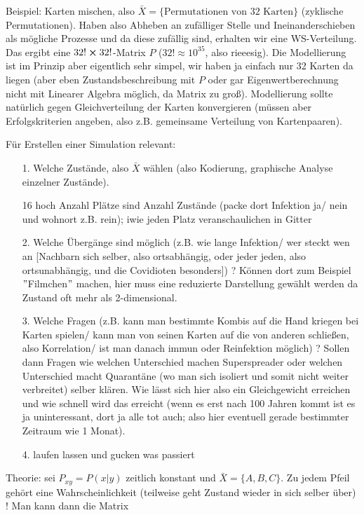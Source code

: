 \documentclass[../KlassMech_main.tex]{subfiles}
\begin{document}
Beispiel: Karten mischen, also $\bar{X}= \{\text{Permutationen von 32 Karten}\}$ (zyklische Permutationen). Haben also Abheben an zufälliger Stelle und Ineinanderschieben als mögliche Prozesse und da diese zufällig sind, erhalten wir eine WS-Verteilung. Das ergibt eine $32! \cross 32!$-Matrix $P$ ($32! \approx10^{35}$, also rieeesig). Die Modellierung ist im Prinzip aber eigentlich sehr simpel, wir haben ja einfach nur 32 Karten da liegen (aber eben Zustandsbeschreibung mit $P$ oder gar Eigenwertberechnung nicht mit Linearer Algebra möglich, da Matrix zu groß). Modellierung sollte natürlich gegen Gleichverteilung der Karten konvergieren (müssen aber Erfolgskriterien angeben, also z.B. gemeinsame Verteilung von Kartenpaaren).

Für Erstellen einer Simulation relevant:
\begin{itemize}
\item[1.] Welche Zustände, also $\bar{X}$ wählen (also Kodierung, graphische Analyse einzelner Zustände).

16 hoch Anzahl Plätze sind Anzahl Zustände (packe dort Infektion ja/ nein und wohnort z.B. rein); iwie jeden Platz veranschaulichen in Gitter

\item[2.] Welche Übergänge sind möglich (z.B. wie lange Infektion/ wer steckt wen an [Nachbarn sich selber, also ortsabhängig, oder jeder jeden, also ortsunabhängig, und die Covidioten besonders]) ? Können dort zum Beispiel $"$Filmchen$"$ machen, hier muss eine reduzierte Darstellung gewählt werden da Zustand oft mehr als 2-dimensional.

\item[3.] Welche Fragen (z.B. kann man bestimmte Kombis auf die Hand kriegen bei Karten spielen/ kann man von seinen Karten auf die von anderen schließen, also Korrelation/ ist man danach immun oder Reinfektion möglich) ? Sollen dann Fragen wie welchen Unterschied machen Superspreader oder welchen Unterschied macht Quarantäne (wo man sich isoliert und somit nicht weiter verbreitet) selber klären. Wie lässt sich hier also ein Gleichgewicht erreichen und wie schnell wird das erreicht (wenn es erst nach 100 Jahren kommt ist es ja uninteressant, dort ja alle tot auch; also hier eventuell gerade bestimmter Zeitraum wie 1 Monat).

\item[4.] laufen lassen und gucken was passiert
\end{itemize}

Theorie: sei $P_{xy} = P(x|y)$ zeitlich konstant und $\bar{X}= \{A, B, C\}$. Zu jedem Pfeil gehört eine Wahrscheinlichkeit (teilweise geht Zustand wieder in sich selber über) ! Man kann dann die Matrix 
\end{document}
